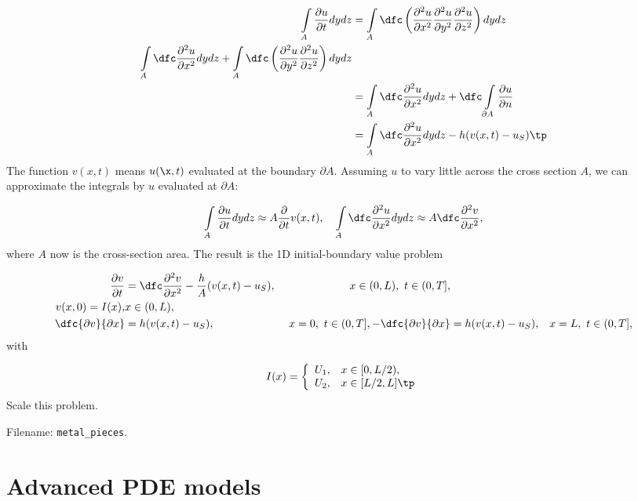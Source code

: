 \documentclass[graybox,envcountchap,sectrefs,final]{svmonodo}
\newenvironment{doconceexercise}{}{}
\begin{document}
\begin{doconceexercise}
\begin{align*}
\int\limits_A \frac{\partial u}{\partial t}dydz &=
\int\limits_A \dfc\left(
\frac{\partial^2 u}{\partial x^2}
\frac{\partial^2 u}{\partial y^2}
\frac{\partial^2 u}{\partial z^2}
\right)dydz \\ 
\int\limits_A \dfc
\frac{\partial^2 u}{\partial x^2}
dydz +
\int\limits_A \dfc\left(
\frac{\partial^2 u}{\partial y^2}
\frac{\partial^2 u}{\partial z^2}
\right)dydz \\ 
& =
\int\limits_A \dfc
\frac{\partial^2 u}{\partial x^2}
dydz +
\dfc\int\limits_{\partial A}\frac{\partial u}{\partial n}\\ 
& = \int\limits_A \dfc
\frac{\partial^2 u}{\partial x^2}
dydz -h(v(x,t) -u_S)\tp
\end{align*}
The function $v(x,t)$ means $u(\x,t)$ evaluated at the boundary $\partial A$.
Assuming $u$ to vary little across the cross section $A$, we can
approximate the integrals by $u$ evaluated at $\partial A$:

\[ \int\limits_A \frac{\partial u}{\partial t}dydz\approx A
\frac{\partial}{\partial t} v(x,t),
\quad
\int\limits_A \dfc
\frac{\partial^2 u}{\partial x^2}
dydz \approx A \dfc \frac{\partial^2 v}{\partial x^2},
\]
where $A$ now is the cross-section area.
The result is the 1D initial-boundary value problem

\begin{align}
\frac{\partial v}{\partial t} &=
\dfc \frac{\partial^2 v}{\partial x^2}
-\frac{h}{A}(v(x,t) -u_S),\ & x\in (0,L),\ t\in (0,T],\\ 
v(x,0)=I(x), & x\in (0,L),\\ 
 \dfc{\partial v}{\partial x} &= h(v(x,t)-u_S), & x=0,\ t\in (0,T],
-\dfc{\partial v}{\partial x} &= h(v(x,t)-u_S), & x=L,\ t\in (0,T],
\end{align}
with

\[
I(x) = \left\lbrace\begin{array}{ll}
U_1, & x\in [0,L/2),\\ 
U_2, & x\in [L/2, L]\tp
\end{array}\right.
\]
Scale this problem.


\noindent Filename: \Verb!metal_pieces!.

\end{doconceexercise}


\chapter{Advanced PDE models}
\end{document}
